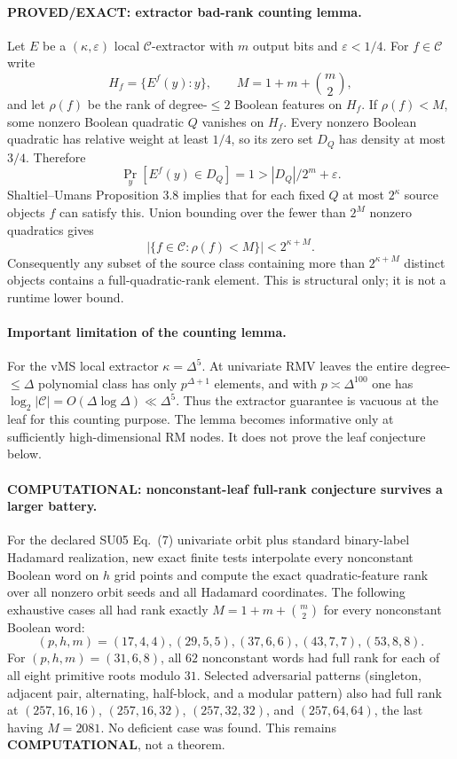 \documentclass[11pt]{article}
\begin{document}
\paragraph{PROVED/EXACT: extractor bad-rank counting lemma.}
Let $E$ be a $(\kappa,\varepsilon)$ local $\mathcal C$-extractor with $m$ output bits and $\varepsilon<1/4$. For $f\in\mathcal C$ write
\[
H_f=\{E^f(y):y\},\qquad M=1+m+\binom m2,
\]
and let $\rho(f)$ be the rank of degree-$\le2$ Boolean features on $H_f$. If $\rho(f)<M$, some nonzero Boolean quadratic $Q$ vanishes on $H_f$. Every nonzero Boolean quadratic has relative weight at least $1/4$, so its zero set $D_Q$ has density at most $3/4$. Therefore
\[
\Pr_y[E^f(y)\in D_Q]=1> |D_Q|/2^m+\varepsilon.
\]
Shaltiel--Umans Proposition 3.8 implies that for each fixed $Q$ at most $2^\kappa$ source objects $f$ can satisfy this. Union bounding over the fewer than $2^M$ nonzero quadratics gives
\[
\boxed{|\{f\in\mathcal C:\rho(f)<M\}|<2^{\kappa+M}.}
\]
Consequently any subset of the source class containing more than $2^{\kappa+M}$ distinct objects contains a full-quadratic-rank element. This is structural only; it is not a runtime lower bound.

\paragraph{Important limitation of the counting lemma.}
For the vMS local extractor $\kappa=\Delta^5$. At univariate RMV leaves the entire degree-$\le\Delta$ polynomial class has only $p^{\Delta+1}$ elements, and with $p\asymp\Delta^{100}$ one has $\log_2|\mathcal C|=O(\Delta\log\Delta)\ll\Delta^5$. Thus the extractor guarantee is vacuous at the leaf for this counting purpose. The lemma becomes informative only at sufficiently high-dimensional RM nodes. It does not prove the leaf conjecture below.

\paragraph{COMPUTATIONAL: nonconstant-leaf full-rank conjecture survives a larger battery.}
For the declared SU05 Eq.~(7) univariate orbit plus standard binary-label Hadamard realization, new exact finite tests interpolate every nonconstant Boolean word on $h$ grid points and compute the exact quadratic-feature rank over all nonzero orbit seeds and all Hadamard coordinates. The following exhaustive cases all had rank exactly $M=1+m+\binom m2$ for every nonconstant Boolean word:
\[
(p,h,m)=(17,4,4),(29,5,5),(37,6,6),(43,7,7),(53,8,8).
\]
For $(p,h,m)=(31,6,8)$, all $62$ nonconstant words had full rank for each of all eight primitive roots modulo $31$. Selected adversarial patterns (singleton, adjacent pair, alternating, half-block, and a modular pattern) also had full rank at $(257,16,16)$, $(257,16,32)$, $(257,32,32)$, and $(257,64,64)$, the last having $M=2081$. No deficient case was found. This remains \textbf{COMPUTATIONAL}, not a theorem.
\end{document}
